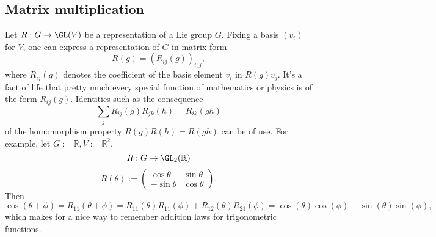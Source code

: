 \documentclass[reqno]{amsart} 
\begin{document}
\subsection{Matrix multiplication}
\label{sec:org601ff7d}
Let $R : G \rightarrow \GL(V)$ be a representation
of a Lie group $G$.
Fixing a basis $(v_i)$ for $V$,
one can express a representation of $G$ in matrix form
\begin{equation*}
  R(g) = (R_{i j}(g))_{i,j},
\end{equation*}
where $R_{i j}(g)$ denotes the coefficient of
the basis element $v_i$
in $R(g) v_j$.
It's a fact of life that pretty much every special function
of mathematics or physics
is of the form $R_{i j}(g)$.
Identities such as the consequence
\begin{equation*}
  \sum_j R_{i j}(g) R_{j k}(h)
  = R_{i k}(g h)
\end{equation*}
of the homomorphism property
$R(g) R(h) = R(g h)$
can be of use.
For example,
let $G := \mathbb{R}, V := \mathbb{R}^2$,
\begin{equation*}
  R : G \rightarrow \GL_2(\mathbb{R})
\end{equation*}
\begin{equation*}
  R(\theta) := 
\begin{pmatrix}
    \cos \theta  & \sin \theta  \\
    - \sin \theta  & \cos \theta 
  \end{pmatrix}
.
\end{equation*}
Then
\begin{equation*}
  \cos(\theta + \phi)
  = R_{1 1}(\theta + \phi)
  = R_{1 1}(\theta) R_{1 1}(\phi)
  + R_{1 2}(\theta) R_{2 1}(\phi)
  = \cos(\theta) \cos(\phi)
  - \sin(\theta) \sin(\phi),
\end{equation*}
which makes for a nice way to remember
addition laws for trigonometric functions.
\end{document}
